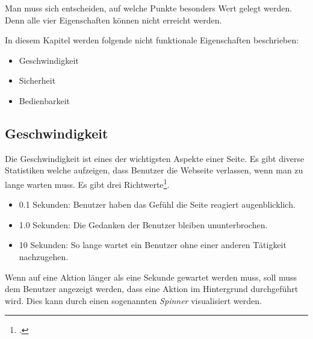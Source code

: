 Man muss sich entscheiden, auf welche Punkte besonders Wert gelegt werden. Denn alle vier Eigenschaften können nicht erreicht werden.

In diesem Kapitel werden folgende nicht funktionale Eigenschaften beschrieben:
\begin{itemize}
\item Geschwindigkeit
\item Sicherheit
\item Bedienbarkeit
\end{itemize}

\subsection{Geschwindigkeit}
Die Geschwindigkeit ist eines der wichtigsten Aspekte einer Seite. Es gibt diverse Statistiken welche aufzeigen, dass Benutzer die Webseite verlassen, wenn man zu lange warten muss. Es gibt drei Richtwerte\footcite{Response_Time_Limits_Article_by_Jakob_Nielsen_2015-06-01}.
\begin{itemize}
\item 0.1 Sekunden: Benutzer haben das Gefühl die Seite reagiert augenblicklich.
\item 1.0 Sekunden: Die Gedanken der Benutzer bleiben ununterbrochen.
\item 10 Sekunden: So lange wartet ein Benutzer ohne einer anderen Tätigkeit nachzugehen.
\end{itemize}
Wenn auf eine Aktion länger als eine Sekunde gewartet werden muss, soll muss dem Benutzer angezeigt werden, dass eine Aktion im Hintergrund durchgeführt wird. Dies kann durch einen sogenannten \textit{Spinner} visualisiert werden.


